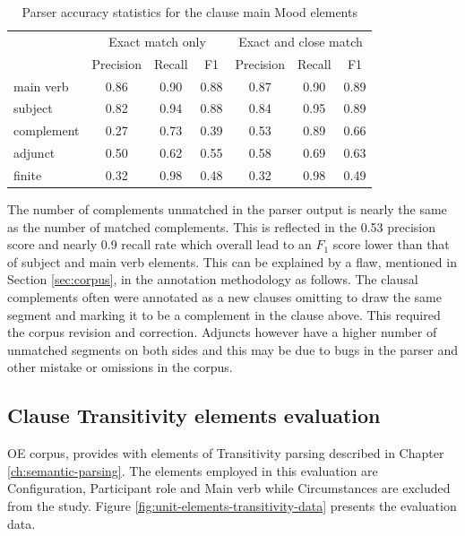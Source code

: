     \begin{table}[!ht]
    \centering
    \begin{tabular}{lcccccc}
    \toprule
     & \multicolumn{3}{c}{Exact match only} & \multicolumn{3}{c}{Exact and close match} \\ \cline{2-7} 
     & Precision & Recall & F1 & Precision & Recall & F1 \\ 
    \midrule
    main verb & 0.86 & 0.90 & 0.88 & 0.87 & 0.90 & 0.89 \\
    subject & 0.82 & 0.94 & 0.88 & 0.84 & 0.95 & 0.89 \\
    complement & 0.27 & 0.73 & 0.39 & 0.53 & 0.89 & 0.66 \\
    adjunct & 0.50 & 0.62 & 0.55 & 0.58 & 0.69 & 0.63 \\
    finite & 0.32 & 0.98 & 0.48 & 0.32 & 0.98 & 0.49 \\
    \bottomrule
    \end{tabular}
    \caption{Parser accuracy statistics for the clause main Mood elements}
    \label{tab:unit-elements-mood-combined-F1}
    \end{table}
    
    The number of complements unmatched in the parser output is nearly the same as the number of matched complements. This is reflected in the 0.53 precision score and nearly 0.9 recall rate which overall lead to an $F_1$ score lower than that of subject and main verb elements. This can be explained by a flaw, mentioned in Section \ref{sec:corpus}, in the annotation methodology as follows. The clausal complements often were annotated as a new clauses omitting to draw the same segment and marking it to be a complement in the clause above. This required the corpus revision and correction. Adjuncts however have a higher number of unmatched segments on both sides and this may be due to bugs in the parser and other mistake or omissions in the corpus.
    
\subsection{Clause Transitivity elements evaluation}
\label{sec:unit-transitivity-element-evaluation}

    OE corpus, provides with elements of Transitivity parsing described in Chapter \ref{ch:semantic-parsing}. The elements employed in this evaluation are Configuration, Participant role and Main verb while Circumstances are excluded from the study. Figure \ref{fig:unit-elements-transitivity-data} presents the evaluation data. 
    

